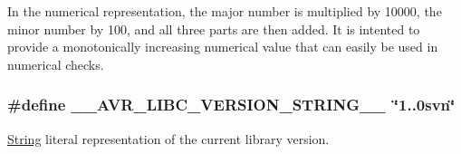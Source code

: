 In the numerical representation, the major number is multiplied by 10000, the minor number by 100, and all three parts are then added. It is intented to provide a monotonically increasing numerical value that can easily be used in numerical checks. 
\subsubsection[{\texorpdfstring{\+\_\+\+\_\+\+A\+V\+R\+\_\+\+L\+I\+B\+C\+\_\+\+V\+E\+R\+S\+I\+O\+N\+\_\+\+S\+T\+R\+I\+N\+G\+\_\+\+\_\+}{__AVR_LIBC_VERSION_STRING__}}]{\setlength{\rightskip}{0pt plus 5cm}\#define \+\_\+\+\_\+\+A\+V\+R\+\_\+\+L\+I\+B\+C\+\_\+\+V\+E\+R\+S\+I\+O\+N\+\_\+\+S\+T\+R\+I\+N\+G\+\_\+\+\_\+~\char`\"{}1..\+0svn\char`\"{}}\hypertarget{group__avr__version_gaace584c6d368436814b4fe12d71230f9}{}\label{group__avr__version_gaace584c6d368436814b4fe12d71230f9}
\hyperlink{class_string}{String} literal representation of the current library version. 